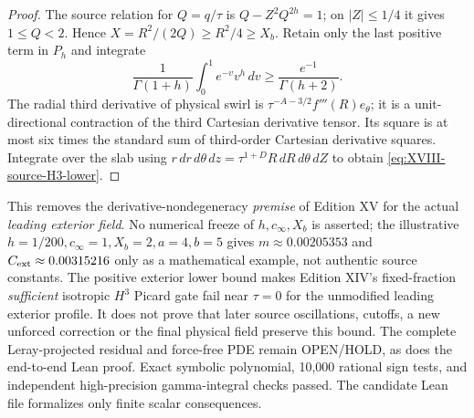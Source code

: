 \begin{proof}
The source relation for $Q=q/\tau$ is
$Q-Z^2Q^{2h}=1$; on $|Z|\le1/4$ it gives $1\le Q<2$.
Hence $X=R^2/(2Q)\ge R^2/4\ge X_b$.
Retain only the last positive term in $P_h$ and integrate
\[
\frac1{\Gamma(1+h)}\int_0^1e^{-v}v^h\,dv
\ge \frac{e^{-1}}{\Gamma(h+2)}.
\]
The radial third derivative of physical swirl is
$\tau^{-A-3/2}f'''(R)e_\theta$; it is a unit-directional
contraction of the third Cartesian derivative tensor.
Its square is at most six times the standard sum of
third-order Cartesian derivative squares. Integrate over
the slab using $r\,dr\,d\theta\,dz=
\tau^{1+D}R\,dR\,d\theta\,dZ$ to obtain
\eqref{eq:XVIII-source-H3-lower}.
\end{proof}
This removes the derivative-nondegeneracy \emph{premise} of
Edition XV for the actual \emph{leading exterior field}.
No numerical freeze of $h,c_\infty,X_b$ is asserted;
the illustrative $h=1/200,c_\infty=1,X_b=2,a=4,b=5$
gives $m\approx0.00205353$ and $C_{\rm ext}\approx0.00315216$
only as a mathematical example, not authentic source constants.
The positive exterior lower bound makes Edition XIV's
fixed-fraction \emph{sufficient} isotropic $H^3$ Picard gate fail
near $\tau=0$ for the unmodified leading exterior profile.
It does not prove that later source oscillations, cutoffs, a
new unforced correction or the final physical field preserve
this bound. The complete Leray-projected residual and
force-free PDE remain OPEN/HOLD, as does the end-to-end Lean proof.
Exact symbolic polynomial, 10,000 rational sign tests, and
independent high-precision gamma-integral checks passed.
The candidate Lean file formalizes only finite scalar consequences.